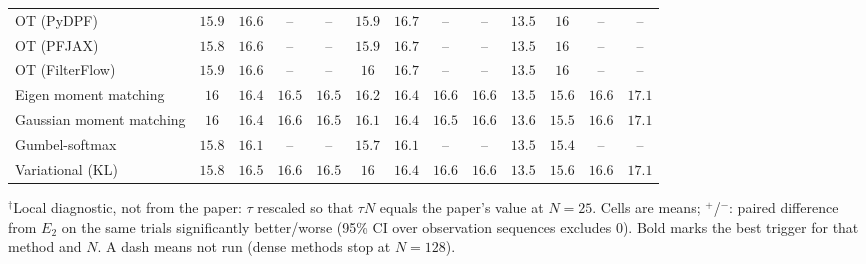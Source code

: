 \begin{table}[ht]
\begin{adjustbox}{max width=\linewidth}
\begin{tabular}{lcccc|cccc|cccc}
OT (PyDPF) & $15.9$ & $16.6$ & -- & -- & $15.9$ & $16.7$ & -- & -- & $13.5$ & $16$ & -- & -- \\
OT (PFJAX) & $15.8$ & $16.6$ & -- & -- & $15.9$ & $16.7$ & -- & -- & $13.5$ & $16$ & -- & -- \\
OT (FilterFlow) & $15.9$ & $16.6$ & -- & -- & $16$ & $16.7$ & -- & -- & $13.5$ & $16$ & -- & -- \\
Eigen moment matching & $16$ & $16.4$ & $16.5$ & $16.5$ & $16.2$ & $16.4$ & $16.6$ & $16.6$ & $13.5$ & $15.6$ & $16.6$ & $17.1$ \\
Gaussian moment matching & $16$ & $16.4$ & $16.6$ & $16.5$ & $16.1$ & $16.4$ & $16.5$ & $16.6$ & $13.6$ & $15.5$ & $16.6$ & $17.1$ \\
Gumbel-softmax & $15.8$ & $16.1$ & -- & -- & $15.7$ & $16.1$ & -- & -- & $13.5$ & $15.4$ & -- & -- \\
Variational (KL) & $15.8$ & $16.5$ & $16.6$ & $16.5$ & $16$ & $16.4$ & $16.6$ & $16.6$ & $13.5$ & $15.6$ & $16.6$ & $17.1$ \\
\bottomrule
\end{tabular}
\end{adjustbox}
\par\smallskip\parbox{0.95\linewidth}{\footnotesize $^\dagger$Local diagnostic, not from the paper: $\tau$ rescaled so that $\tau N$ equals the paper's value at $N{=}25$. Cells are means; $^{+}$/$^{-}$: paired difference from $E_2$ on the same trials significantly better/worse (95\% CI over observation sequences excludes 0). Bold marks the best trigger for that method and $N$. A dash means not run (dense methods stop at $N{=}128$).}
\end{table}


